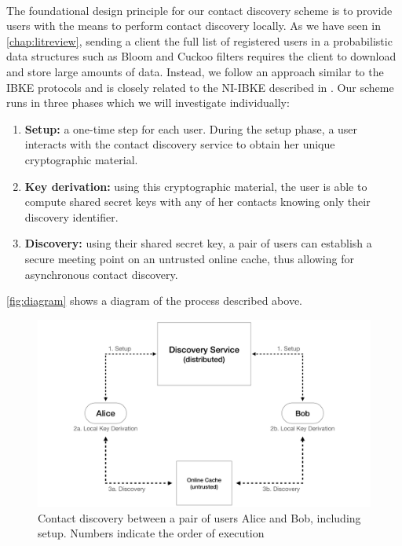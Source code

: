 \paragraph{} The foundational design principle for our contact discovery scheme is to provide users with the means to perform contact discovery locally. As we have seen in \autoref{chap:litreview}, sending a client the full list of registered users in a probabilistic data structures such as Bloom and Cuckoo filters requires the client to download and store large amounts of data. Instead, we follow an approach similar to the IBKE protocols and is closely related to the NI-IBKE described in \cite{LRPRF}. Our scheme runs in three phases which we will investigate individually:
\begin{enumerate}
	\item \textbf{Setup:} a one-time step for each user. During the setup phase, a user interacts with the contact discovery service to obtain her unique cryptographic material.
	\item \textbf{Key derivation:} using this cryptographic material, the user is able to compute shared secret keys with any of her contacts knowing only their discovery identifier.	\item \textbf{Discovery:} using their shared secret key, a pair of users can establish a secure meeting point on an untrusted online cache, thus allowing for asynchronous contact discovery.
\end{enumerate}

\noindent \autoref{fig:diagram} shows a diagram of the process described above.

\begin{figure}[H]
	\begin{center}	
	  \includegraphics[width=\textwidth]{figures/system}
	  \caption{Contact discovery between a pair of users Alice and Bob, including setup. Numbers indicate the order of execution}
	  \label{fig:diagram}
	 \end{center}
 \end{figure}

